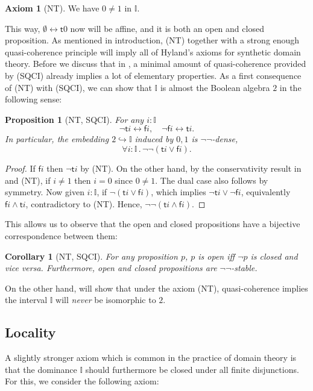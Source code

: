 \documentclass[a4paper,12pt]{amsart}
\newtheorem{corollary}[theorem]{Corollary}
\newtheorem{proposition}[theorem]{Proposition}
\theoremstyle{definition}
\newtheorem*{axiom}{Axiom}
\newcommand{\mbb}[1]{\mathbb{#1}}
\newcommand{\I}{\mbb I}
\newcommand{\ms}[1]{\mathsf{#1}}
\newcommand{\hook}{\hookrightarrow}
\newcommand{\dneg}{\neg\neg}
\newcommand{\fa}[2]{\forall #1\!\colon\!\!#2\mathpunct{.}}
\newcommand{\emp}{\emptyset}
\newcommand{\eq}{\leftrightarrow}
\begin{document}
\begin{axiom}[NT]\label{ax:nt}
  We have $0 \neq 1$ in $\I$.
\end{axiom}

This way, $\emp \eq \ms t0$ now will be affine, and it is both an open and closed proposition. As mentioned in introduction, (NT) together with a strong enough quasi-coherence principle will imply all of Hyland's axioms for synthetic domain theory. Before we discuss that in , a minimal amount of quasi-coherence provided by (SQCI) already implies a lot of elementary properties. As a first consequence of (NT) with (SQCI), we can show that $\I$ is almost the Boolean algebra $2$ in the following sense:

\begin{proposition}[NT, SQCI]\label{prop:filed}
  For any $i : \I$ 
  \[ \neg \ms ti \eq \ms fi, \quad \neg\ms fi \eq \ms ti. \]
  In particular, the embedding $2 \hook \I$ induced by $0,1$ is $\neg\neg$-dense,
  \[ \fa i\I \dneg(\ms ti \vee \ms fi). \]
\end{proposition}
\begin{proof}
  If $\ms fi$ then $\neg\ms ti$ by (NT). On the other hand, by the conservativity result in  and (NT), if $i \neq 1$ then $i = 0$ since $0 \neq 1$. The dual case also follows by symmetry. Now given $i :\I$, if $\neg(\ms ti \vee \ms fi)$, which implies $\neg\ms ti \vee \neg\ms fi$, equivalently $\ms fi \wedge \ms ti$, contradictory to (NT). Hence, $\neg\neg(\ms ti \wedge \ms fi)$.
\end{proof}

This allows us to observe that the open and closed propositions have a bijective correspondence between them:

\begin{corollary}[NT, SQCI]\label{cor:opendnegclose}
  For any proposition $p$, $p$ is open iff $\neg p$ is closed and vice versa. Furthermore, open and closed propositions are $\dneg$-stable.
\end{corollary}

On the other hand,  will show that under the axiom (NT), quasi-coherence implies the interval $\I$ will \emph{never} be isomorphic to $2$. 

\subsection{Locality}

A slightly stronger axiom which is common in the practice of domain theory is that the dominance $\I$ should furthermore be closed under all finite disjunctions. For this, we consider the following axiom:
\end{document}

